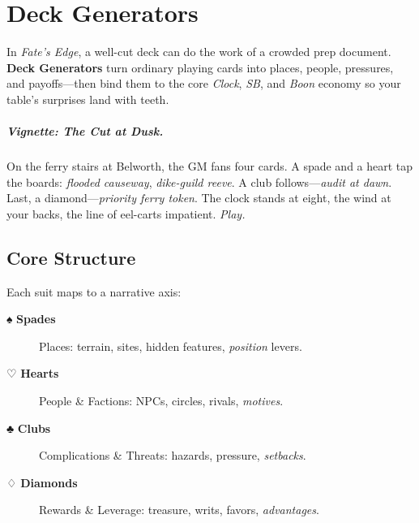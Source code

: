 
\chapter{Deck Generators}
\label{ch:deck-generators}

\begin{multicols}{2}

In \textit{Fate’s Edge}, a well-cut deck can do the work of a crowded prep document. \textbf{Deck Generators} turn ordinary playing cards into places, people, pressures, and payoffs—then bind them to the core \emph{Clock}, \emph{SB}, and \emph{Boon} economy so your table’s surprises land with teeth.

\paragraph{Vignette: The Cut at Dusk.}
On the ferry stairs at Belworth, the GM fans four cards. A spade and a heart tap the boards: \emph{flooded causeway}, \emph{dike-guild reeve}. A club follows—\emph{audit at dawn}. Last, a diamond—\emph{priority ferry token}. The clock stands at eight, the wind at your backs, the line of eel-carts impatient. \emph{Play.}

\section{Core Structure}
Each suit maps to a narrative axis:

\begin{description}
  \item[{\large ♠} \textbf{Spades}] Places: terrain, sites, hidden features, \emph{position} levers.
  \item[{\large ♡} \textbf{Hearts}] People \& Factions: NPCs, circles, rivals, \emph{motives}.
  \item[{\large ♣} \textbf{Clubs}] Complications \& Threats: hazards, pressure, \emph{setbacks}.
  \item[{\large ♢} \textbf{Diamonds}] Rewards \& Leverage: treasure, writs, favors, \emph{advantages}.
\end{description}


\end{multicols}
